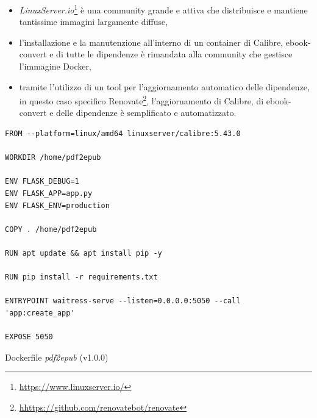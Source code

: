 \begin{itemize}
    \item \textit{LinuxServer.io}\footnote{\url{https://www.linuxserver.io/}} è una community grande e attiva che distribuisce e mantiene tantissime immagini largamente diffuse,
    \item l'installazione e la manutenzione all'interno di un container di Calibre, ebook-convert e di tutte le dipendenze è rimandata alla community che gestisce l'immagine Docker,
    \item tramite l'utilizzo di un tool per l'aggiornamento automatico delle dipendenze, in questo caso specifico Renovate\footnote{\url{hhttps://github.com/renovatebot/renovate}}, l'aggiornamento di Calibre, di ebook-convert e delle dipendenze è semplificato e automatizzato.
\end{itemize}
\begin{listing}[H]
\begin{verbatim}
FROM --platform=linux/amd64 linuxserver/calibre:5.43.0

WORKDIR /home/pdf2epub

ENV FLASK_DEBUG=1
ENV FLASK_APP=app.py
ENV FLASK_ENV=production

COPY . /home/pdf2epub

RUN apt update && apt install pip -y

RUN pip install -r requirements.txt

ENTRYPOINT waitress-serve --listen=0.0.0.0:5050 --call 'app:create_app'

EXPOSE 5050
\end{verbatim}
\caption{Dockerfile \textit{pdf2epub} (v1.0.0)}
\end{listing}

